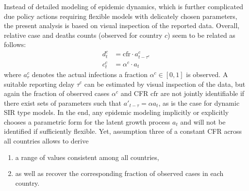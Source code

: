 \documentclass[fullpage,a4paper]{article}
\begin{document}
Instead of detailed modeling of epidemic dynamics, which is further
complicated due policy actions requiring flexible models with
delicately chosen parameters, the present analysis is based on visual
inspection of the reported data. Overall, relative case and deaths
counts (observed for country $c$) seem to be related as follows:
\begin{align*}
  d^c_t &= \mathrm{cfr} \cdot a^c_{t - {\tau^c}} \\
  c^c_t &= \alpha^c \cdot a_t
\end{align*}
where $a^c_r$ denotes the actual infections a fraction $\alpha^c \in
[0, 1]$ is observed. A suitable reporting delay $\tau^c$ can be
estimated by visual inspection of the data, but again the fraction of
observed cases $\alpha^c$ and CFR $\mathrm{cfr}$ are not jointly
identifiable if there exist sets of parameters such that $a'_{t -
  {\tau}} = \alpha a_t$, as is the case for dynamic SIR type
models. In the end, any epidemic modeling implicitly or explicitly
chooses a parametric form for the latent growth process $a_t$ and will
not be identified if sufficiently flexible. Yet, assumption three of
a constant CFR across all countries allows to derive
\begin{enumerate}
\item a range of values consistent among all countries,
\item as well as recover the corresponding fraction of observed cases
  in each country.
\end{enumerate}
\end{document}
